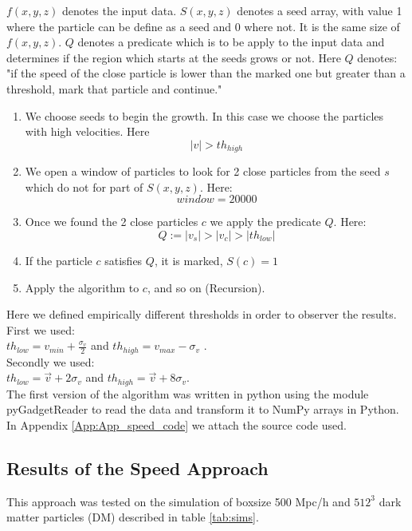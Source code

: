 \documentclass[12pt]{article}
\begin{document}
\begin{par}
$f(x,y,z)$ denotes the input data. $S(x,y,z)$ denotes a seed array, with
value 1 where the particle can be define as a seed and 0 where not. It is the
same size of $f(x,y,z)$. $Q$ denotes a predicate which is to be apply to the
input data and determines if the region which
 starts at the seeds grows or
not. Here $Q$ denotes: "if the speed of the close
 particle is lower than the
marked one but greater than a threshold, mark that
 particle and continue."
\end{par}

\begin{enumerate}
	\item We choose seeds to begin the growth. In
	 this case we choose the particles with high
	  velocities. Here \[ |v|>  th_{high}\]
	\item We open a window of particles to look
	 for 2 close particles from the seed $s$ which
	  do not for part of $S(x,y,z)$. Here:
    \[ window = 20000\]
    \item Once we found the 2 close particles $c$ we apply the predicate $Q$. Here:
    \[ Q := |v_s| > |v_c| > |th_{low}|\]
    
    \item If the particle $c$ satisfies $Q$, it is
     marked, $S(c) = 1$
    \item Apply the algorithm to $c$, and so on
     (Recursion).
\end{enumerate}

Here we defined empirically different thresholds
 in order to observer the results. \\
First we used:  \\
$th_{low} = v_{min} + \frac{\sigma_{v}}{2} $ and
 $th_{high} = v_{max}  - \sigma_{v}$ .\\
Secondly we used: \\
$th_{low} = \vec{v} + 2  \sigma_{v} $ and $th_{high} = \vec{v}  +  8 \sigma_{v}$.\\

The first version of the algorithm was written in
 python using the module
pyGadgetReader
 \cite{thompson_pygadgetreader_2014ascl_soft11001T}
  to read the
data and transform it to NumPy arrays in Python.
 In Appendix \ref{App:App_speed_code} we attach
  the source code used.

\subsection{Results of the Speed Approach}
This approach was tested on the simulation of
 boxsize 500 Mpc/h
and $512^{3}$ dark matter particles (DM) described
 in table \ref{tab:sims}. \\
\end{document}
